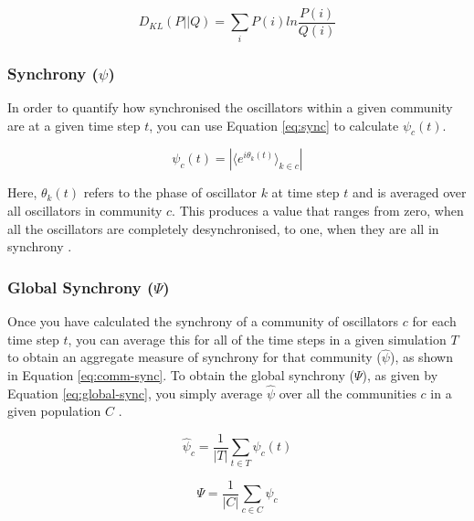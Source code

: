 \documentclass[a4paper,11pt]{article}
\begin{document}
\begin{equation}
\label{eq:kld}
D_{KL}(P || Q) = \sum_{i} P(i) ln \frac{P(i)}{Q(i)}
\end{equation}

\subsubsection{Synchrony ($\psi$)}
\label{sec:bg:sync}

In order to quantify how synchronised the oscillators within a given community are at a given time step $t$, you can use Equation \ref{eq:sync} to calculate $\psi_c(t)$\cite{Shanahan2010}. 

\begin{equation} \label{eq:sync}
\psi_c(t) = |\langle e^{i\theta_k(t)}\rangle_{k \in c}|
\end{equation}

Here, $\theta_k(t)$ refers to the phase of oscillator $k$ at time step $t$ and is averaged over all oscillators in community $c$. This produces a value that ranges from zero, when all the oscillators are completely desynchronised, to one, when they are all in synchrony \cite{Shanahan2010}.

\subsubsection{Global Synchrony ($\Psi$)}
\label{sec:bg:global-sync}

Once you have calculated the synchrony of a community of oscillators $c$ for each time step $t$, you can average this for all of the time steps in a given simulation $T$ to obtain an aggregate measure of synchrony for that community ($\widehat{\psi}$), as shown in Equation \ref{eq:comm-sync}.  To obtain the global synchrony ($\Psi$), as given by Equation \ref{eq:global-sync}, you simply average $\widehat{\psi}$ over all the communities $c$ in a given population $C$ \cite{Shanahan2010}.

\begin{equation} \label{eq:comm-sync}
\widehat{\psi}_c = \frac{1}{|T|} \sum_{t \in T} \psi_c(t)
\end{equation}

\begin{equation} \label{eq:global-sync}
\Psi = \frac{1}{|C|} \sum_{c \in C} \widehat{\psi}_c
\end{equation}
 
\end{document}
